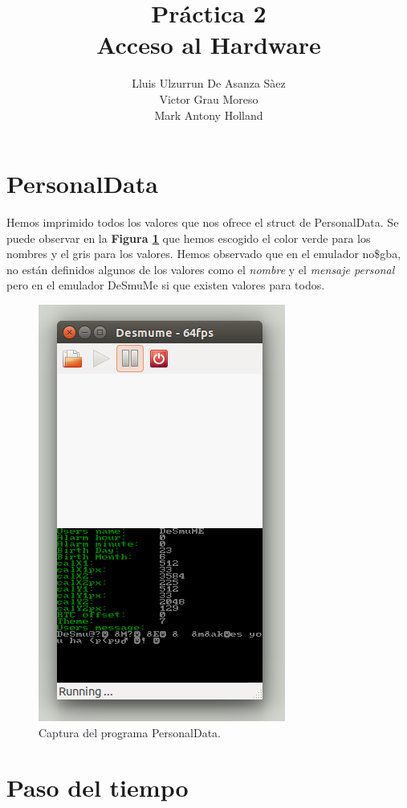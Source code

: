 \documentclass[12pt,english]{article}
\title{Práctica 2\\ Acceso al Hardware}
\author{Lluis Ulzurrun De Asanza Sàez\\Victor Grau Moreso \\Mark Antony Holland}
\date{}
\begin{document}
    \maketitle

    \tableofcontents

    \newpage
    
    \section{PersonalData}

    Hemos imprimido todos los valores que nos ofrece el struct de PersonalData. Se puede observar en la \textbf{Figura \ref{s1}} que hemos escogido el color verde para los nombres y el gris para los valores. Hemos observado que en el emulador no\$gba, no están definidos algunos de los valores como el \emph{nombre} y el \emph{mensaje personal} pero en el emulador DeSmuMe si que existen valores para todos.

    \begin{figure}[H] 
    \centering
    \includegraphics[scale=0.5]{images/personaldata}
    \caption{Captura del programa PersonalData.}
    \label{s1}
    \end{figure}
      
    \newpage
    \section{Paso del tiempo}
\end{document}
